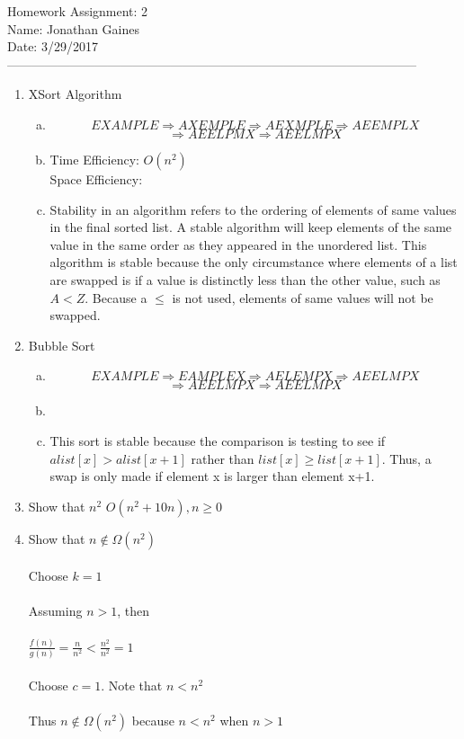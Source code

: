 \documentclass[12pt]{article}
\newcommand\tab[1][1cm]{\hspace*{#1}}
\begin{document}
Homework Assignment: 2\\ 
Name: Jonathan Gaines\\ 
Date: 3/29/2017\\ --------------------------------------------------------------------------------------------------
\begin {enumerate}
\item XSort Algorithm
	\begin {enumerate}[(a)]
		\item
		$$EXAMPLE\Rightarrow 
			AXEMPLE\Rightarrow	
			AEXMPLE\Rightarrow
			AEEMPLX$$ $$\Rightarrow 
		  AEELPMX\Rightarrow
			AEELMPX $$		
		\item
			Time Efficiency: $O(n^{2})$ \\
			Space Efficiency: 
		\item 
			Stability in an algorithm refers to the ordering of elements of same values in the final sorted list. A stable algorithm will keep elements of the same value in the same order as they appeared in the unordered list. This algorithm is stable because the only circumstance where elements of a list are swapped is if a value is distinctly less than the other value, such as $A < Z$. Because a $\leq$ is not used, elements of same values will not be swapped. \par
	\end {enumerate}
\item Bubble Sort
	\begin {enumerate}[(a)]
		\item
		$$EXAMPLE\Rightarrow 
			EAMPLEX\Rightarrow	
			AELEMPX\Rightarrow
			AEELMPX$$ $$\Rightarrow
			AEELMPX\Rightarrow
			AEELMPX $$
		\item

		\item
			This sort is stable because the comparison is testing to see if $alist[x] > alist[x+1]$ rather than $list[x] \geq list[x+1]$. Thus, a swap is only made if element x is larger than element x+1. \par 
	\end {enumerate}
\item Show that $n^{2}$ \in $O(n^{2}+10n), n \geq 0$

\item Show that $n \not\in \Omega(n^{2})$ \\ \\
	\tab Choose $k=1$ \\ \\
	\tab Assuming $n > 1$, then \\ \\
	\tab $\frac{f(n)}{g(n)} = \frac{n}{n^{2}} < \frac{n^{2}}{n^{2}} = 1$ \\ \\
	\tab Choose $c=1$. Note that $n < n^{2}$ \\ \\
	\tab Thus $n \not\in \Omega(n^{2})$ because $n<n^{2}$ when $n>1$
\end {enumerate}
\end{document}
